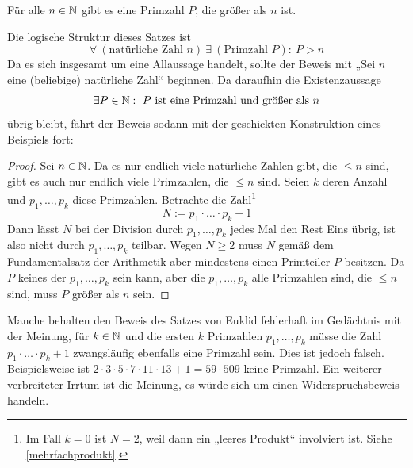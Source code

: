 \begin{bsp} \label{euklid}
    Für alle $n\in \mathbb N$ gibt es eine Primzahl $P$, die größer als $n$ ist.
\end{bsp}
\begin{bem}
    Die logische Struktur dieses Satzes ist
        \[ \forall\ (\text{natürliche Zahl $n$})\ \exists\ (\text{Primzahl $P$}):\ P>n \]
    Da es sich insgesamt um eine Allaussage handelt, sollte der Beweis mit „Sei $n$ eine (beliebige) natürliche Zahl“ beginnen. Da daraufhin die Existenzaussage
        \[ \exists P\in \mathbb N:\ \text{$P$ ist eine Primzahl und größer als $n$} \]
    übrig bleibt, fährt der Beweis sodann mit der geschickten Konstruktion eines Beispiels fort:
\end{bem}
\begin{proof}
    Sei $n\in \mathbb N$. Da es nur endlich viele natürliche Zahlen gibt, die $\le n$ sind, gibt es auch nur endlich viele Primzahlen, die $\le n$ sind. Seien $k$ deren Anzahl und $p_1,\dots , p_k$ diese Primzahlen. Betrachte die Zahl\footnote{Im Fall $k=0$ ist $N=2$, weil dann ein „leeres Produkt“ involviert ist. Siehe \cref{mehrfachprodukt}.}
        \[ N := p_1\cdot\ldots\cdot p_k + 1 \]
    Dann lässt $N$ bei der Division durch $p_1,\dots , p_k$ jedes Mal den Rest Eins übrig, ist also nicht durch $p_1,\dots , p_k$ teilbar. Wegen $N\ge 2$ muss $N$ gemäß dem Fundamentalsatz der Arithmetik aber mindestens einen Primteiler $P$ besitzen. Da $P$ keines der $p_1,\dots ,p_k$ sein kann, aber die $p_1,\dots , p_k$ alle Primzahlen sind, die $\le n$ sind, muss $P$ größer als $n$ sein.
\end{proof}


\begin{bem}[*]
    Manche behalten den Beweis des Satzes von Euklid fehlerhaft im Gedächtnis mit der Meinung, für $k\in \mathbb N$ und die ersten $k$ Primzahlen $p_1,\dots , p_k$ müsse die Zahl $p_1\cdot\ldots\cdot p_k + 1$ zwangsläufig ebenfalls eine Primzahl sein. Dies ist jedoch falsch. Beispielsweise ist $2\cdot 3\cdot 5\cdot 7\cdot 11\cdot 13+1=59\cdot 509$ keine Primzahl. Ein weiterer verbreiteter Irrtum ist die Meinung, es würde sich um einen Widerspruchsbeweis handeln.
\end{bem}


